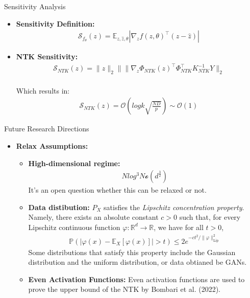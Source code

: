\documentclass[serif, aspectratio=169]{beamer}
\begin{document}
\begin{frame}{Sensitivity Analysis}
    \begin{itemize}
        \item \textbf{Sensitivity Definition:}
            \begin{align*}                
                \mathcal{S}_{f_{\theta}}(z) = \mathbb{E}_{z, \hat{z}, \theta} | \nabla_{z} f(z, \theta)^{\top} (z - \hat{z}) |
            \end{align*}
        \item \textbf{NTK Sensitivity:}
        \begin{align*}
            \mathcal{S}_{NTK}(z) = \|z\|_{2} \| \| \nabla_{z} \Phi_{NTK}(z)^{\top} \Phi_{NTK}^{\top} K_{NTK}^{-1} Y \|_{2}
        \end{align*}\\
        Which results in:
        \begin{align*}
            \mathcal{S}_{NTK}(z) = \mathcal{O}\left(log k \sqrt{\frac{ND}{p}}\right) \sim \mathcal{O}(1)
        \end{align*}
    \end{itemize}
\end{frame}


\begin{frame}{Future Research Directions}
    \begin{itemize}
        \item \textbf{Relax Assumptions:}
            \begin{itemize}
                \item \textbf{High-dimensional regime: }
                \begin{align*}
                    N log^{3} N \mathcal{o}(d^{\frac{3}{2}})
                \end{align*}
                It's an open question whether this can be relaxed or not.
                \item \textbf{Data distibution: }
                $P_X$ satisfies the \textit{Lipschitz concentration property}. Namely, there exists an absolute constant $c > 0$ such that, for every Lipschitz continuous function $\varphi : \mathbb{R}^d \to \mathbb{R}$, we have for all $t > 0$,
                \begin{align*}
                    \mathbb{P}\left( \left| \varphi(x) - \mathbb{E}_X[\varphi(x)] \right| > t \right) \leq 2e^{-ct^2 / \|\varphi\|_{\text{Lip}}^2}
                \end{align*}
                Some distributions that satisfy this property include the Gaussian distribution and the uniform distribution, or data obtianed be GANs.
                \item \textbf{Even Activation Functions: }
                Even activation functions are used to prove the upper bound of the NTK by Bombari et al. (2022).  
            \end{itemize}
    \end{itemize}
\end{frame}
\end{document}
